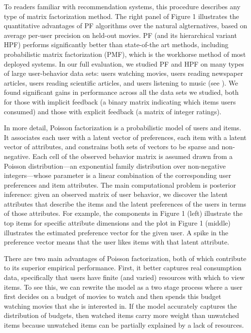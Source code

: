 To readers familiar with recommendation systems, this procedure
describes any type of matrix factorization method.  The right panel of
Figure 1 illustrates the quantitative advantages of PF algorithms over
the natural algternatives, based on average per-user precision on
held-out movies.  PF (and its hierarchical variant HPF) performs
significantly better than state-of-the art methods, including
probabilistic matrix factorization (PMF), which is the workhorse
method of most deployed systems.  In our full evaluation, we studied
PF and HPF on many types of large user-behavior data sets: users
watching movies, users reading newspaper articles, users reading
scientific articles, and users listening to music (see ).
We found significant gains in performance across all the data sets we
studied, both for those with implicit feedback (a binary matrix
indicating which items users consumed) and those with explicit
feedback (a matrix of integer ratings).

In more detail, Poisson factorization is a probabilistic model of
users and items.  It associates each user with a latent vector of
preferences, each item with a latent vector of attributes, and
constrains both sets of vectors to be sparse and non-negative.  Each
cell of the observed behavior matrix is assumed drawn from a Poisson
distribution---an exponential family distribution over non-negative
integers---whose parameter is a linear combination of the
corresponding user preferences and item attributes.  The main
computational problem is posterior inference: given an observed matrix
of user behavior, we discover the latent attributes that describe the
items and the latent preferences of the users in terms of those
attributes.  For example, the components in Figure 1 (left) illustrate
the top items for specific attribute dimensions and the plot in Figure
1 (middle) illustrates the estimated preference vector for the given
user.  A spike in the preference vector means that the user likes
items with that latent attribute.

There are two main advantages of Poisson factorization, both of which
contribute to its superior empirical performance.  First, it better
captures real consumption data, specifically that users have finite
(and varied) resources with which to view items.  To see this, we can
rewrite the model as a two stage process where a user first decides on
a budget of movies to watch and then spends this budget watching
movies that she is interested in.  If the model accurately captures
the distribution of budgets, then watched items carry more weight than
unwatched items because unwatched items can be partially explained by
a lack of resources.

